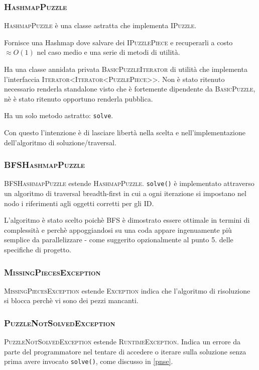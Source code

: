 \documentclass[a4paper]{article}
\newcommand{\Classname}[1]{\textsc{#1}}
\newcommand{\Ifacename}[1]{\textsc{#1}}
\newcommand{\Methodname}[1]{\texttt{#1}}
\begin{document}
\subsubsection{\Classname{HashmapPuzzle}}
\Classname{HashmapPuzzle} \`e una classe astratta che implementa \Ifacename{IPuzzle}.

Fornisce una Hashmap dove salvare dei \Ifacename{IPuzzlePiece}  e recuperarli a costo $\approx O(1)$ nel caso medio e una serie di metodi di utilit\`a.

Ha una classe annidata privata \Classname{BasicPuzzleIterator} di utilit\`a che implementa l'interfaccia \Ifacename{Iterator<Iterator<PuzzlePiece>>}. Non \`e stato ritenuto necessario renderla standalone visto che \`e fortemente dipendente da \Classname{BasicPuzzle}, n\`e \`e stato ritenuto opportuno renderla pubblica.

Ha un solo metodo astratto: \Methodname{solve}.

Con questo l'intenzione \`e di lasciare libert\`a nella scelta e nell'implementazione dell'algoritmo di soluzione/traversal.

\subsubsection{\Classname{BFSHashmapPuzzle}}
\Classname{BFSHashmapPuzzle} estende \Classname{HashmapPuzzle}.
\Methodname{solve()} \`e implementato attraverso un algoritmo di traversal breadth-first \cite{cormen2001introduction} in cui a ogni iterazione si impostano nel nodo i riferimenti agli oggetti corretti per gli ID.

L'algoritmo \`e stato scelto poich\`e BFS \`e dimostrato essere ottimale in termini di complessit\`a e perch\`e appoggiandosi su una coda appare ingenuamente pi\`u semplice da parallelizzare - come suggerito opzionalmente al punto 5. delle specifiche di progetto\cite{prspec}.
\subsubsection{\Classname{MissingPiecesException}}
\Classname{MissingPiecesException} estende \Classname{Exception} indica che l'algoritmo di risoluzione si blocca perch\`e vi sono dei pezzi mancanti.

\subsubsection{\Classname{PuzzleNotSolvedException}}
\Classname{PuzzleNotSolvedException} estende \Classname{RuntimeException}.
Indica un errore da parte del programmatore nel tentare di accedere o iterare sulla soluzione senza prima avere invocato \Methodname{solve()}, come discusso in \ref{pnse}.
\end{document}
